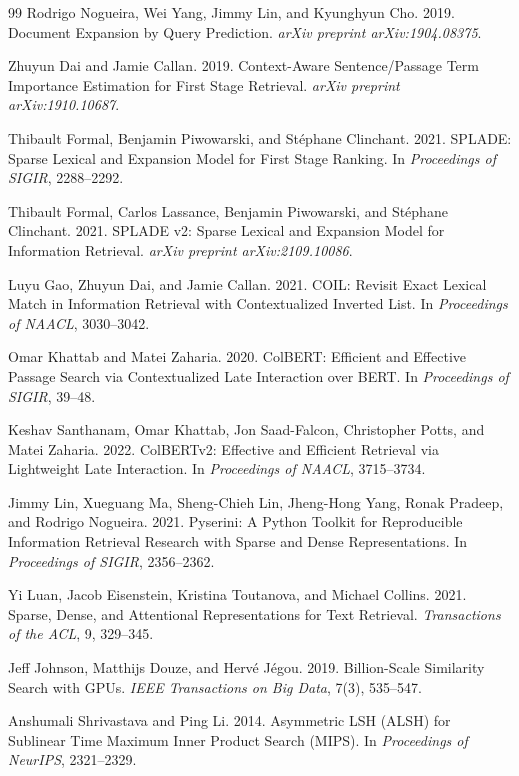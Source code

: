 \documentclass[sigconf]{acmart}
\begin{document}
\begin{thebibliography}{99}
Rodrigo Nogueira, Wei Yang, Jimmy Lin, and Kyunghyun Cho. 2019. Document Expansion by Query Prediction. \textit{arXiv preprint arXiv:1904.08375}.

Zhuyun Dai and Jamie Callan. 2019. Context-Aware Sentence/Passage Term Importance Estimation for First Stage Retrieval. \textit{arXiv preprint arXiv:1910.10687}.

Thibault Formal, Benjamin Piwowarski, and St\'ephane Clinchant. 2021. SPLADE: Sparse Lexical and Expansion Model for First Stage Ranking. In \textit{Proceedings of SIGIR}, 2288--2292.

Thibault Formal, Carlos Lassance, Benjamin Piwowarski, and St\'ephane Clinchant. 2021. SPLADE v2: Sparse Lexical and Expansion Model for Information Retrieval. \textit{arXiv preprint arXiv:2109.10086}.

Luyu Gao, Zhuyun Dai, and Jamie Callan. 2021. COIL: Revisit Exact Lexical Match in Information Retrieval with Contextualized Inverted List. In \textit{Proceedings of NAACL}, 3030--3042.

Omar Khattab and Matei Zaharia. 2020. ColBERT: Efficient and Effective Passage Search via Contextualized Late Interaction over BERT. In \textit{Proceedings of SIGIR}, 39--48.

Keshav Santhanam, Omar Khattab, Jon Saad-Falcon, Christopher Potts, and Matei Zaharia. 2022. ColBERTv2: Effective and Efficient Retrieval via Lightweight Late Interaction. In \textit{Proceedings of NAACL}, 3715--3734.

Jimmy Lin, Xueguang Ma, Sheng-Chieh Lin, Jheng-Hong Yang, Ronak Pradeep, and Rodrigo Nogueira. 2021. Pyserini: A Python Toolkit for Reproducible Information Retrieval Research with Sparse and Dense Representations. In \textit{Proceedings of SIGIR}, 2356--2362.

Yi Luan, Jacob Eisenstein, Kristina Toutanova, and Michael Collins. 2021. Sparse, Dense, and Attentional Representations for Text Retrieval. \textit{Transactions of the ACL}, 9, 329--345.

Jeff Johnson, Matthijs Douze, and Herv\'e J\'egou. 2019. Billion-Scale Similarity Search with GPUs. \textit{IEEE Transactions on Big Data}, 7(3), 535--547.

Anshumali Shrivastava and Ping Li. 2014. Asymmetric LSH (ALSH) for Sublinear Time Maximum Inner Product Search (MIPS). In \textit{Proceedings of NeurIPS}, 2321--2329.


\end{thebibliography}
\end{document}
